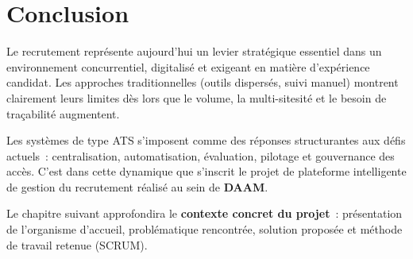 \section{Conclusion}

Le recrutement représente aujourd'hui un levier stratégique essentiel dans un
environnement concurrentiel, digitalisé et exigeant en matière d'expérience candidat.
Les approches traditionnelles (outils dispersés, suivi manuel) montrent clairement
leurs limites dès lors que le volume, la multi-sitesité et le besoin de traçabilité
augmentent.

Les systèmes de type ATS s'imposent comme des réponses structurantes aux défis
actuels~: centralisation, automatisation, évaluation, pilotage et gouvernance des
accès. C'est dans cette dynamique que s'inscrit le projet de plateforme intelligente
de gestion du recrutement réalisé au sein de \textbf{DAAM}.

Le chapitre suivant approfondira le \textbf{contexte concret du projet}~: présentation
de l'organisme d'accueil, problématique rencontrée, solution proposée et méthode
de travail retenue (SCRUM).

\clearpage
